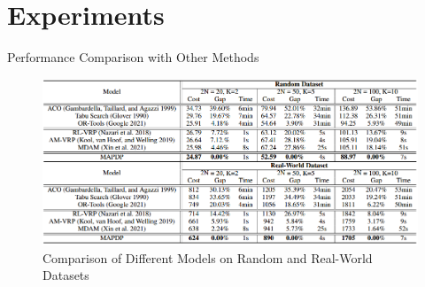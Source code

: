 \documentclass{beamer}
\begin{document}
\section{Experiments}

\begin{frame}{Performance Comparison with Other Methods}
	\begin{figure}
		\centering
		\includegraphics[scale=0.3]{table1.png}
		\caption{Comparison of Different Models on Random and Real-World Datasets}
	\end{figure}
\end{frame}
\end{document}
